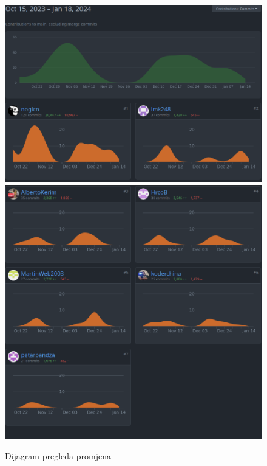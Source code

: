 		\begin{figure}[H]
			\includegraphics[scale=0.35]{slike/Commitovi1.png}
			\includegraphics[scale=0.35]{slike/Commitovi2.png}
			\centering
			\caption{Dijagram pregleda promjena}
			\label{fig:promjene}
		\end{figure}
		
	
